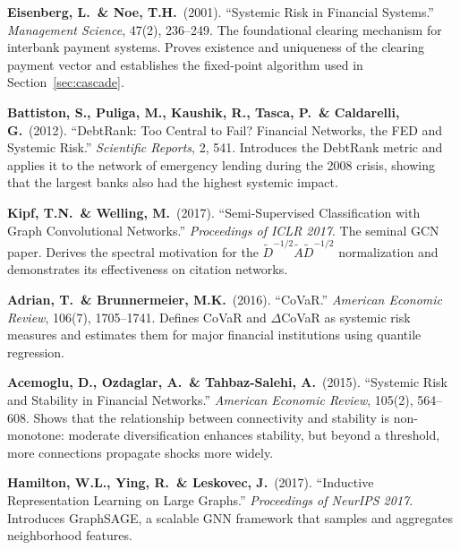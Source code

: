 \documentclass[11pt, a4paper]{article}
\theoremstyle{definition}
\theoremstyle{plain}
\theoremstyle{remark}
\begin{document}
\begin{enumerate}[label={[\arabic*]}, leftmargin=2cm]
    \item \textbf{Eisenberg, L.\ \& Noe, T.H.}\ (2001).
          ``Systemic Risk in Financial Systems.''
          \emph{Management Science}, 47(2), 236--249.
          The foundational clearing mechanism for interbank payment systems.
          Proves existence and uniqueness of the clearing payment vector and establishes
          the fixed-point algorithm used in Section~\ref{sec:cascade}.

    \item \textbf{Battiston, S., Puliga, M., Kaushik, R., Tasca, P.\ \& Caldarelli, G.}\ (2012).
          ``DebtRank: Too Central to Fail? Financial Networks, the FED and Systemic Risk.''
          \emph{Scientific Reports}, 2, 541.
          Introduces the DebtRank metric and applies it to the network of emergency
          lending during the 2008 crisis, showing that the largest banks also had
          the highest systemic impact.

    \item \textbf{Kipf, T.N.\ \& Welling, M.}\ (2017).
          ``Semi-Supervised Classification with Graph Convolutional Networks.''
          \emph{Proceedings of ICLR 2017}.
          The seminal GCN paper.
          Derives the spectral motivation for the $\tilde{D}^{-1/2}\tilde{A}\tilde{D}^{-1/2}$
          normalization and demonstrates its effectiveness on citation networks.

    \item \textbf{Adrian, T.\ \& Brunnermeier, M.K.}\ (2016).
          ``CoVaR.''
          \emph{American Economic Review}, 106(7), 1705--1741.
          Defines CoVaR and $\Delta$CoVaR as systemic risk measures and estimates
          them for major financial institutions using quantile regression.

    \item \textbf{Acemoglu, D., Ozdaglar, A.\ \& Tahbaz-Salehi, A.}\ (2015).
          ``Systemic Risk and Stability in Financial Networks.''
          \emph{American Economic Review}, 105(2), 564--608.
          Shows that the relationship between connectivity and stability is
          non-monotone: moderate diversification enhances stability, but beyond
          a threshold, more connections propagate shocks more widely.

    \item \textbf{Hamilton, W.L., Ying, R.\ \& Leskovec, J.}\ (2017).
          ``Inductive Representation Learning on Large Graphs.''
          \emph{Proceedings of NeurIPS 2017}.
          Introduces GraphSAGE, a scalable GNN framework that samples and
          aggregates neighborhood features.


\end{enumerate}
\end{document}
